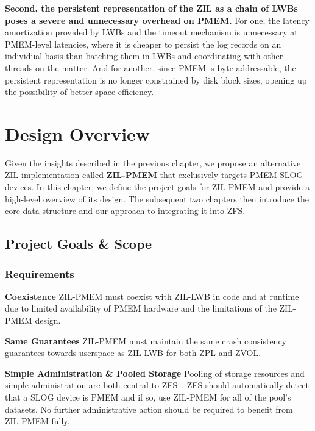 \documentclass[12pt,a4paper,twoside]{book}
\begin{document}
{\textbf{Second, the persistent representation of the ZIL as a chain of LWBs poses a severe and unnecessary overhead on PMEM.}
For one, the latency amortization provided by LWBs and the timeout mechanism is unnecessary at PMEM-level latencies, where it is cheaper to persist the log records on an individual basis than batching them in LWBs and coordinating with other threads on the matter.
And for another, since PMEM is byte-addressable, the persistent representation is no longer constrained by disk block sizes, opening up the possibility of better space efficiency.

\chapter{Design Overview}\label{ch:designoverview}
Given the insights described in the previous chapter, we propose an alternative ZIL implementation called \textbf{ZIL-PMEM} that exclusively targets PMEM SLOG devices.
In this chapter, we define the project goals for ZIL-PMEM and provide a high-level overview of its design.
The subsequent two chapters then introduce the core data structure and our approach to integrating it into ZFS.

\section{Project Goals \& Scope}

\newcommand{\csgoal}[1]{\textbf{#1}}

\subsection{Requirements}\label{sec:requirements}

\csgoal{Coexistence}
ZIL-PMEM must coexist with ZIL-LWB in code and at runtime due to limited availability of PMEM hardware and the limitations of the ZIL-PMEM design.

\csgoal{Same Guarantees}
ZIL-PMEM must maintain the same crash consistency guarantees towards userspace as ZIL-LWB for both ZPL and ZVOL.

\csgoal{Simple Administration \& Pooled Storage}
Pooling of storage resources and simple administration are both central to ZFS~\cite{bonwickZettabyteFileSystem2003}.
ZFS should automatically detect that a SLOG device is PMEM and if so, use ZIL-PMEM for all of the pool’s datasets.
No further administrative action should be required to benefit from ZIL-PMEM fully.

}
\end{document}
